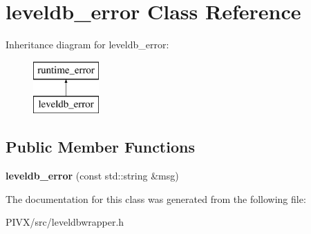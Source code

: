 \hypertarget{classleveldb__error}{}\section{leveldb\+\_\+error Class Reference}
\label{classleveldb__error}
Inheritance diagram for leveldb\+\_\+error\+:\begin{figure}[H]
\begin{center}
\leavevmode
\includegraphics[height=2.000000cm]{classleveldb__error}
\end{center}
\end{figure}
\subsection*{Public Member Functions}
\begin{DoxyCompactItemize}
\item 
\mbox{\label{classleveldb__error_a20e012c5a8f796abd5c5af3f7829ee07}} 
{\bfseries leveldb\+\_\+error} (const std\+::string \&msg)
\end{DoxyCompactItemize}


The documentation for this class was generated from the following file\+:\begin{DoxyCompactItemize}
\item 
P\+I\+V\+X/src/leveldbwrapper.\+h\end{DoxyCompactItemize}
